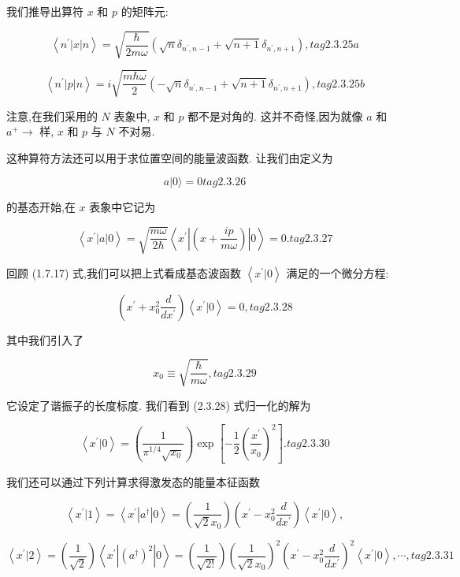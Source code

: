 \documentclass[lang=cn,newtx,10pt,scheme=chinese,thmcnt=section]{elegantbook}
\begin{document}
我们推导出算符 $x$ 和 $p$ 的矩阵元:

$$
\left\langle {{n}^{\prime }\left| x\right| n}\right\rangle = \sqrt{\frac{\hbar }{2m\omega }}\left( {\sqrt{n}{\delta }_{{n}^{\prime }, n - 1} + \sqrt{n + 1}{\delta }_{{n}^{\prime }, n + 1}}\right) , tag{2.3.25a}
$$

$$
\left\langle {{n}^{\prime }\left| p\right| n}\right\rangle = i\sqrt{\frac{m\hbar \omega }{2}}\left( {-\sqrt{n}{\delta }_{{n}^{\prime }, n - 1} + \sqrt{n + 1}{\delta }_{{n}^{\prime }, n + 1}}\right) , tag{2.3.25b}
$$

注意,在我们采用的 $N$ 表象中, $x$ 和 $p$ 都不是对角的. 这并不奇怪,因为就像 $a$ 和 ${a}^{ + } \rightarrow$ 样, $x$ 和 $p$ 与 $N$ 不对易.

这种算符方法还可以用于求位置空间的能量波函数. 让我们由定义为

$$
a | 0\rangle = 0 tag{2.3.26}
$$

的基态开始,在 $x$ 表象中它记为

$$
\left\langle {{x}^{\prime }\left| a\right| 0}\right\rangle = \sqrt{\frac{m\omega }{2\hbar }}\left\langle {{x}^{\prime }\left| \left( {x + \frac{ip}{m\omega }}\right) \right| 0}\right\rangle = 0. tag{2.3.27}
$$

回顾 (1.7.17) 式,我们可以把上式看成基态波函数 $\left\langle {{x}^{\prime } | 0}\right\rangle$ 满足的一个微分方程:

$$
\left( {{x}^{\prime } + {x}_{0}^{2}\frac{d}{d{x}^{\prime }}}\right) \left\langle {{x}^{\prime } | 0}\right\rangle = 0, tag{2.3.28}
$$

其中我们引入了

$$
{x}_{0} \equiv \sqrt{\frac{\hbar }{m\omega }}, tag{2.3.29}
$$

它设定了谐振子的长度标度. 我们看到 (2.3.28) 式归一化的解为

$$
\left\langle {{x}^{\prime } | 0}\right\rangle = \left( \frac{1}{{\pi }^{1/4}\sqrt{{x}_{0}}}\right) \exp \left\lbrack {-\frac{1}{2}{\left( \frac{{x}^{\prime }}{{x}_{0}}\right) }^{2}}\right\rbrack . tag{2.3.30}
$$

我们还可以通过下列计算求得激发态的能量本征函数

$$
\left\langle {{x}^{\prime } | 1}\right\rangle = \left\langle {{x}^{\prime }\left| {a}^{ \dagger }\right| 0}\right\rangle = \left( \frac{1}{\sqrt{2}{x}_{0}}\right) \left( {{x}^{\prime } - {x}_{0}^{2}\frac{d}{d{x}^{\prime }}}\right) \left\langle {{x}^{\prime } | 0}\right\rangle ,
$$

$$
\left\langle {{x}^{\prime } | 2}\right\rangle = \left( \frac{1}{\sqrt{2}}\right) \left\langle {{x}^{\prime }\left| {\left( {a}^{ \dagger }\right) }^{2}\right| 0}\right\rangle = \left( \frac{1}{\sqrt{2!}}\right) {\left( \frac{1}{\sqrt{2}{x}_{0}}\right) }^{2}{\left( {x}^{\prime } - {x}_{0}^{2}\frac{d}{d{x}^{\prime }}\right) }^{2}\left\langle {{x}^{\prime } | 0}\right\rangle ,\cdots , tag{2.3.31}
$$
\end{document}
